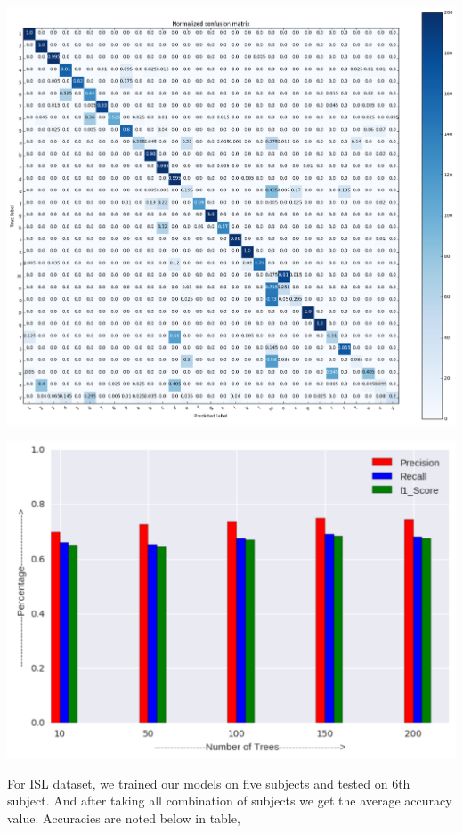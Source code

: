\documentclass[a0,landscape]{a0poster}
\begin{document}
\begin{multicols}{4}
\begin{center}\vspace{1cm}
\includegraphics[width=0.90\linewidth]{cm_normalized}
\end{center}\vspace{1cm}

\begin{center}\vspace{1cm}
\includegraphics[width=0.90\linewidth]{f1}
\end{center}\vspace{1cm}

For ISL dataset, we trained our models on five subjects and tested on 6th subject. And after taking all combination of subjects we get the average accuracy value. Accuracies are noted below in table,


\end{multicols}
\end{document}
